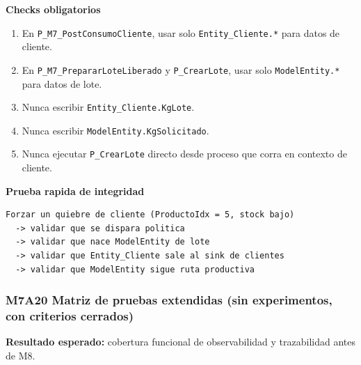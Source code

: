 \documentclass[11pt]{article}
\newcommand{\state}[1]{\texttt{#1}}
\newcommand{\proc}[1]{\texttt{#1}}
\begin{document}
\textbf{Checks obligatorios}
\begin{enumerate}
  \item En \proc{P\_M7\_PostConsumoCliente}, usar solo \state{Entity\_Cliente.*} para datos de cliente.
  \item En \proc{P\_M7\_PrepararLoteLiberado} y \proc{P\_CrearLote}, usar solo \state{ModelEntity.*} para datos de lote.
  \item Nunca escribir \state{Entity\_Cliente.KgLote}.
  \item Nunca escribir \state{ModelEntity.KgSolicitado}.
  \item Nunca ejecutar \proc{P\_CrearLote} directo desde proceso que corra en contexto de cliente.
\end{enumerate}

\textbf{Prueba rapida de integridad}
\begin{lstlisting}[caption={Prueba de integridad entidad-clase en M7A}]
Forzar un quiebre de cliente (ProductoIdx = 5, stock bajo)
  -> validar que se dispara politica
  -> validar que nace ModelEntity de lote
  -> validar que Entity_Cliente sale al sink de clientes
  -> validar que ModelEntity sigue ruta productiva
\end{lstlisting}

\subsubsection{M7A20 Matriz de pruebas extendidas (sin experimentos, con criterios cerrados)}
\textbf{Resultado esperado:} cobertura funcional de observabilidad y trazabilidad antes de M8.
\end{document}
